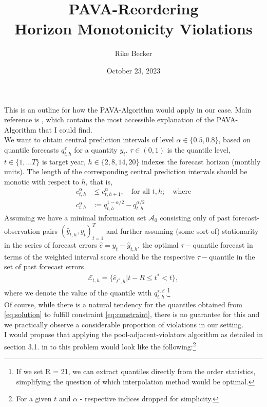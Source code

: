 \documentclass{article}
\title{PAVA-Reordering \\ Horizon Monotonicity Violations}
\author{Rike Becker}
\date{October 23, 2023}
\begin{document}
\maketitle
\noindent
This is an outline for how the PAVA-Algorithm would apply in our case. Main reference is \cite{pavaref2008}, which contains the most accessible explanation of the PAVA-Algorithm that I could find. \bigskip \\ 
\noindent
We want to obtain central prediction intervals of level $\alpha \in \{0.5, 0.8\}$, based on quantile forecasts $q^{\tau}_{t, h}$ for a quantity $y_{t}$. $\tau \in (0,1)$ is the quantile level, $t \in \{1,...T\}$ is target year, $h \in \{2, 8, 14, 20\}$ indexes the forecast horizon (monthly units). The length of the corresponding central prediction intervals should be monotic with respect to $h$, that is, \\
\begin{align}\label{eq:constraint}
  c^{\alpha}_{t,h} &\leq  c^{\alpha}_{t,h+1}, \quad \textrm{for all } t,h; \quad \textrm{where} \\ 
 c^{\alpha}_{t,h} &:= q^{1-\alpha/2}_{t,h} - q^{\alpha/2}_{t,h}
 \end{align}
Assuming we have a minimal information set $\mathcal{A}_{0}$ consisting only of past forecast-observation pairs $(\hat{y}_{t,h}, y_t)_{t = 1}^T$ and further assuming (some sort of) stationarity in the series of forecast errors $\hat{e} = y_t - \hat{y}_{t,h}$, the optimal $\tau-$quantile forecast in terms of the weighted interval score should be the respective $\tau-$quantile in the set of past forecast errors 
\begin{align}\label{eq:solution}
 \mathcal{E}_{t, h} = \{\hat{e}_{t^*, h}  | t-R \leq t^* < t \},
\end{align}
where we denote the value of the quantile with $q^{\tau, \mathcal{E}}_{t, h}$.\footnote{If we set R = 21, we can extract quantiles directly from the order statistics, simplifying the question of which interpolation method would be optimal.}\\ 
Of course, while there is a natural tendency for the quantiles obtained from \eqref{eq:solution} to fulfill constraint \eqref{eq:constraint}, there is no guarantee for this and we practically observe a considerable proportion of violations in our setting. \medskip \\
I would propose that applying the pool-adjacent-violators algorithm as detailed in section 3.1. in \cite{pavaref2008} to this problem would look like the following:\footnote{For a given $t$ and $\alpha$ - respective indices dropped for simplicity.}\\ 
\end{document}
